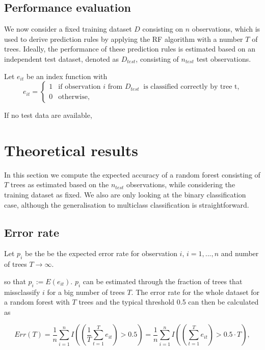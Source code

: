 \documentclass[paper=a4
               ,12pt
               ,DIV=12
               ,parskip=half
               ,titlepage=on
               ,headinclude 
               ,footinclude
               ,headsepline
               ,footsepline         %
               ,ilines 
               ]{scrartcl}
\begin{document}

\subsection{Performance evaluation}
We now consider a fixed training dataset $D$ consisting on $n$ observations, which is used to derive prediction rules by applying the RF algorithm with a number $T$ of trees.
Ideally, the performance of these prediction rules is estimated based on an independent test dataset, denoted as $D_{test}$, consisting of $n_{test}$ test observations.

Let $e_{it}$ be an index function with 
\begin{equation}
   e_{it} =
   \begin{cases}     1 & \text{if observation } i \text{ from\ }D_{test}\ \text{ is classified correctly by tree t,}  \\
     0 & \text{otherwise,}
   \end{cases}
\end{equation}

If no test data are available, 


\section{Theoretical results}
In this section we compute the expected accuracy of a random forest consisting of $T$ trees as estimated based on the $n_{test}$ observations, while considering the training dataset as fixed. 
We also are only looking at the binary classification case, although the generalisation to multiclass classification is straightforward.

\subsection{Error rate}

Let $p_i$ be the be the expected error rate for observation $i$, $i = 1,...,n$ and number of trees $T \rightarrow \infty$. 

so that $p_i := E(e_{it})$. $p_i$ can be estimated through the fraction of trees that missclassify $i$ for a big number of trees $T$. The error rate for the whole dataset for a random forest with $T$ trees and the typical threshold 0.5 
can then be calculated as 

\begin{equation}
 Err(T) = \frac{1}{n} \sum_{i=1}^{n} I ((\frac{1}{T} \sum_{t=1}^T e_{it} ) > 0.5) = \frac{1}{n} \sum_{i=1}^{n} I ((\sum_{t=1}^T e_{it} ) > 0.5 \cdot T), 
\end{equation}
\end{document}
